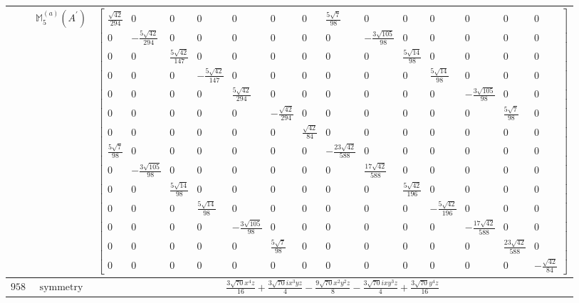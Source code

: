 \documentclass[fleqn,8pt,landscape]{jsarticle}
\begin{document}
\begin{longtable}{ccc}
$  $ & $ \mathbb{M}_{5}^{(a)}(A^{\prime}) $ & $ \begin{bmatrix} \frac{\sqrt{42}}{294} & 0 & 0 & 0 & 0 & 0 & 0 & \frac{5 \sqrt{7}}{98} & 0 & 0 & 0 & 0 & 0 & 0 \\ 0 & - \frac{5 \sqrt{42}}{294} & 0 & 0 & 0 & 0 & 0 & 0 & - \frac{3 \sqrt{105}}{98} & 0 & 0 & 0 & 0 & 0 \\ 0 & 0 & \frac{5 \sqrt{42}}{147} & 0 & 0 & 0 & 0 & 0 & 0 & \frac{5 \sqrt{14}}{98} & 0 & 0 & 0 & 0 \\ 0 & 0 & 0 & - \frac{5 \sqrt{42}}{147} & 0 & 0 & 0 & 0 & 0 & 0 & \frac{5 \sqrt{14}}{98} & 0 & 0 & 0 \\ 0 & 0 & 0 & 0 & \frac{5 \sqrt{42}}{294} & 0 & 0 & 0 & 0 & 0 & 0 & - \frac{3 \sqrt{105}}{98} & 0 & 0 \\ 0 & 0 & 0 & 0 & 0 & - \frac{\sqrt{42}}{294} & 0 & 0 & 0 & 0 & 0 & 0 & \frac{5 \sqrt{7}}{98} & 0 \\ 0 & 0 & 0 & 0 & 0 & 0 & \frac{\sqrt{42}}{84} & 0 & 0 & 0 & 0 & 0 & 0 & 0 \\ \frac{5 \sqrt{7}}{98} & 0 & 0 & 0 & 0 & 0 & 0 & - \frac{23 \sqrt{42}}{588} & 0 & 0 & 0 & 0 & 0 & 0 \\ 0 & - \frac{3 \sqrt{105}}{98} & 0 & 0 & 0 & 0 & 0 & 0 & \frac{17 \sqrt{42}}{588} & 0 & 0 & 0 & 0 & 0 \\ 0 & 0 & \frac{5 \sqrt{14}}{98} & 0 & 0 & 0 & 0 & 0 & 0 & \frac{5 \sqrt{42}}{196} & 0 & 0 & 0 & 0 \\ 0 & 0 & 0 & \frac{5 \sqrt{14}}{98} & 0 & 0 & 0 & 0 & 0 & 0 & - \frac{5 \sqrt{42}}{196} & 0 & 0 & 0 \\ 0 & 0 & 0 & 0 & - \frac{3 \sqrt{105}}{98} & 0 & 0 & 0 & 0 & 0 & 0 & - \frac{17 \sqrt{42}}{588} & 0 & 0 \\ 0 & 0 & 0 & 0 & 0 & \frac{5 \sqrt{7}}{98} & 0 & 0 & 0 & 0 & 0 & 0 & \frac{23 \sqrt{42}}{588} & 0 \\ 0 & 0 & 0 & 0 & 0 & 0 & 0 & 0 & 0 & 0 & 0 & 0 & 0 & - \frac{\sqrt{42}}{84} \end{bmatrix} $ \\ \hline
$ 958 $ & $ \text{symmetry} $ & $ \frac{3 \sqrt{70} x^{4} z}{16} + \frac{3 \sqrt{70} i x^{3} y z}{4} - \frac{9 \sqrt{70} x^{2} y^{2} z}{8} - \frac{3 \sqrt{70} i x y^{3} z}{4} + \frac{3 \sqrt{70} y^{4} z}{16} $ \\

\end{longtable}
\end{document}
